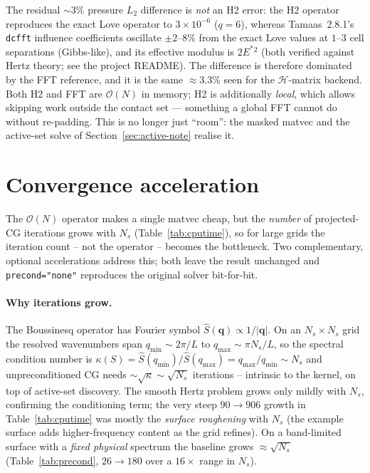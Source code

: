 \documentclass[11pt,a4paper]{article}
\newcommand{\Es}{E^{*}}
\newcommand{\Order}{\mathcal{O}}
\newcommand{\abs}[1]{\left\lvert #1 \right\rvert}
\begin{document}
The residual $\sim3\%$ pressure $L_2$ difference is \emph{not} an H2 error:
the H2 operator reproduces the exact Love operator to $3\times10^{-6}$
($q=6$), whereas Tamaas~2.8.1's \texttt{dcfft} influence coefficients
oscillate $\pm2$--$8\%$ from the exact Love values at $1$--$3$ cell
separations (Gibbs-like), and its effective modulus is $2\Es{}^2$ (both
verified against Hertz theory; see the project README). The difference is
therefore dominated by the FFT reference, and it is the same $\approx3.3\%$
seen for the $\mathcal{H}$-matrix backend. Both H2 and FFT are $\Order(N)$ in
memory; H2 is additionally \emph{local}, which allows skipping work outside
the contact set --- something a global FFT cannot do without re-padding.
This is no longer just ``room'': the masked matvec and the active-set solve
of Section~\ref{sec:active-note} realise it.

\section{Convergence acceleration}
\label{sec:accel}

The $\Order(N)$ operator makes a single matvec cheap, but the \emph{number} of
projected-CG iterations grows with $N_s$ (Table~\ref{tab:cputime}), so for large
grids the iteration count -- not the operator -- becomes the bottleneck. Two
complementary, optional accelerations address this; both leave the result
unchanged and \texttt{precond="none"} reproduces the original solver bit-for-bit.

\paragraph{Why iterations grow.}
The Boussinesq operator has Fourier symbol $\widehat S(\mathbf q)\propto
1/\abs{\mathbf q}$. On an $N_s\times N_s$ grid the resolved wavenumbers span
$q_{\min}\sim 2\pi/L$ to $q_{\max}\sim\pi N_s/L$, so the spectral condition number
is $\kappa(S)=\widehat S(q_{\min})/\widehat S(q_{\max})=q_{\max}/q_{\min}\sim N_s$
and unpreconditioned CG needs $\sim\sqrt{\kappa}\sim\sqrt{N_s}$ iterations --
intrinsic to the kernel, on top of active-set discovery. The smooth Hertz problem
grows only mildly with $N_s$, confirming the conditioning term; the very steep
$90\!\to\!906$ growth in Table~\ref{tab:cputime} was mostly the
\emph{surface roughening} with $N_s$ (the example surface adds higher-frequency
content as the grid refines). On a band-limited surface with a \emph{fixed
physical} spectrum the baseline grows $\approx\sqrt{N_s}$
(Table~\ref{tab:precond}, $26\!\to\!180$ over a $16\times$ range in $N_s$).
\end{document}
